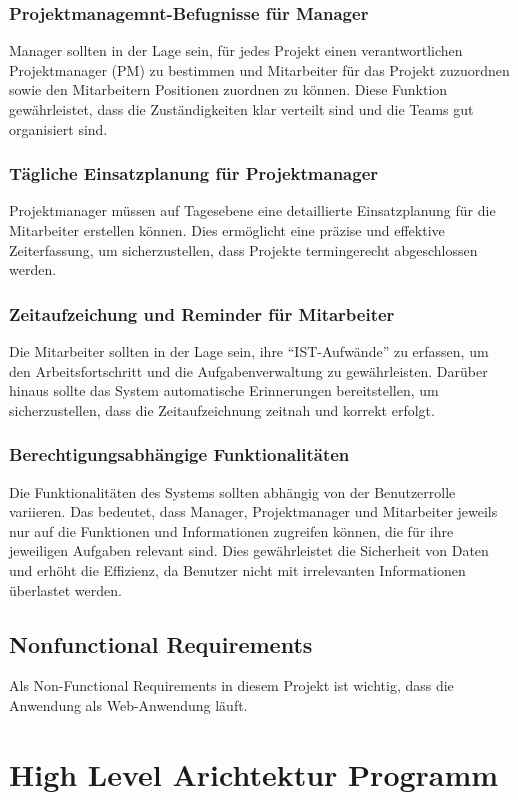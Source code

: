 \documentclass{article}
\begin{document}
        \subsubsection{Projektmanagemnt-Befugnisse für Manager}
        Manager sollten in der Lage sein, für jedes Projekt einen verantwortlichen Projektmanager (PM) zu bestimmen und Mitarbeiter für das Projekt zuzuordnen sowie den Mitarbeitern Positionen zuordnen zu können. Diese Funktion gewährleistet, dass die Zuständigkeiten klar verteilt sind und die Teams gut organisiert sind.
        \subsubsection{Tägliche Einsatzplanung für Projektmanager}
        Projektmanager müssen auf Tagesebene eine detaillierte Einsatzplanung für die Mitarbeiter erstellen können. Dies ermöglicht eine präzise und effektive Zeiterfassung, um sicherzustellen, dass Projekte termingerecht abgeschlossen werden.
        \subsubsection{Zeitaufzeichung und Reminder für Mitarbeiter}
        Die Mitarbeiter sollten in der Lage sein, ihre “IST-Aufwände” zu erfassen, um den Arbeitsfortschritt und die Aufgabenverwaltung zu gewährleisten. Darüber hinaus sollte das System automatische Erinnerungen bereitstellen, um sicherzustellen, dass die Zeitaufzeichnung zeitnah und korrekt erfolgt.
        \subsubsection{Berechtigungsabhängige Funktionalitäten}
        Die Funktionalitäten des Systems sollten abhängig von der Benutzerrolle variieren. Das bedeutet, dass Manager, Projektmanager und Mitarbeiter jeweils nur auf die Funktionen und Informationen zugreifen können, die für ihre jeweiligen Aufgaben relevant sind. Dies gewährleistet die Sicherheit von Daten und erhöht die Effizienz, da Benutzer nicht mit irrelevanten Informationen überlastet werden.
    \subsection{ Nonfunctional Requirements}
    Als Non-Functional Requirements in diesem Projekt ist wichtig, dass die Anwendung als Web-Anwendung läuft.

\newpage

\section{High Level Arichtektur Programm}
\end{document}
